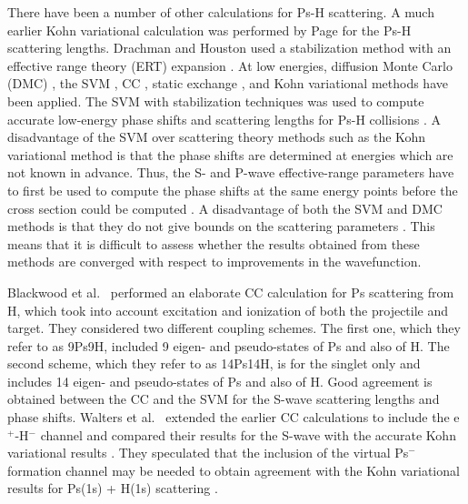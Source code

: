 \documentclass[preprint,showpacs,preprintnumbers,amsmath,amssymb,longbibliography,pra,aps]{revtex4-1}
\begin{document}
There have been a number of other calculations for
Ps-H scattering. A much earlier Kohn variational calculation was performed
by Page \cite{Page1976} for the Ps-H scattering lengths. Drachman and Houston used a stabilization method with an effective range theory (ERT) expansion \cite{Drachman1975,Drachman1976}.
At low energies, diffusion Monte Carlo (DMC) \cite{Chiesa2002},
the SVM \cite{Ivanov2001,Ivanov2002}, CC \cite{Sinha1997,Campbell1998,Adhikari1999,Sinha2000,Blackwood2002,Blackwood2002b,Walters2004}, static exchange \cite{Hara1975,Ray1997}, and Kohn variational \cite{Page1976,VanReeth2003,VanReeth2004} methods have been applied.
The SVM with stabilization techniques was used to compute
accurate low-energy phase shifts and scattering lengths for Ps-H collisions \cite{Ivanov2001,Ivanov2002}.
A disadvantage of the SVM over scattering theory methods
such as the Kohn variational method is that the phase shifts
are determined at energies which are not known in advance.
Thus, the S- and P-wave
effective-range parameters have to first be used to compute the phase shifts at the same energy
points before the cross section could be computed \cite{Ivanov2002}. 
A disadvantage of both the SVM 
and DMC methods is that they do not give
bounds on the scattering parameters \cite{VanReeth2003}.
This means that it is difficult to assess whether the results
obtained from these methods are converged with respect
to improvements in the wavefunction.

Blackwood et al.~\cite{Blackwood2002} performed an elaborate CC calculation for Ps scattering from H, which took into account excitation and ionization of both the projectile and target. They considered two different coupling schemes.
The first one, which they refer to as 9Ps9H, included 9 eigen- and pseudo-states of Ps and also of H. The second scheme, which they refer to as 14Ps14H, is for the singlet only and includes 14 eigen- and pseudo-states of Ps and also of H.
Good agreement is obtained between the CC \cite{Blackwood2002} and the SVM \cite{Ivanov2002}
for the S-wave scattering lengths and phase shifts. Walters et al.~\cite{Walters2004} extended the earlier CC calculations \cite{Blackwood2002} to include the e$^+$-H$^-$ channel \cite{Blackwood2002b} and compared their results for the S-wave with the accurate
Kohn variational results \cite{VanReeth2003}.
They speculated that the inclusion of the virtual Ps$^-$ formation channel may
be needed to obtain agreement with the Kohn variational results
for Ps(1s) + H(1s) scattering \cite{Blackwood2002}.
\end{document}
